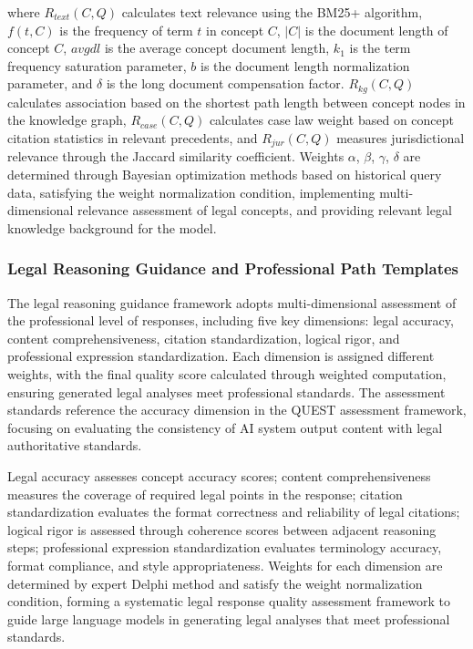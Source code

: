 \documentclass{article}
\theoremstyle{plain}
\theoremstyle{definition}
\begin{document}
where $R_{text}(C, Q)$ calculates text relevance using the BM25+ algorithm, $f(t, C)$ is the frequency of term $t$ in concept $C$, $|C|$ is the document length of concept $C$, $avgdl$ is the average concept document length, $k_1$ is the term frequency saturation parameter, $b$ is the document length normalization parameter, and $\delta$ is the long document compensation factor. $R_{kg}(C, Q)$ calculates association based on the shortest path length between concept nodes in the knowledge graph, $R_{case}(C, Q)$ calculates case law weight based on concept citation statistics in relevant precedents, and $R_{jur}(C, Q)$ measures jurisdictional relevance through the Jaccard similarity coefficient. Weights $\alpha$, $\beta$, $\gamma$, $\delta$ are determined through Bayesian optimization methods based on historical query data, satisfying the weight normalization condition, implementing multi-dimensional relevance assessment of legal concepts, and providing relevant legal knowledge background for the model.

\subsubsection{Legal Reasoning Guidance and Professional Path Templates}
\label{sec3.1.3}

The legal reasoning guidance framework adopts multi-dimensional assessment of the professional level of responses, including five key dimensions: legal accuracy, content comprehensiveness, citation standardization, logical rigor, and professional expression standardization. Each dimension is assigned different weights, with the final quality score calculated through weighted computation, ensuring generated legal analyses meet professional standards. The assessment standards reference the accuracy dimension in the QUEST assessment framework, focusing on evaluating the consistency of AI system output content with legal authoritative standards.

Legal accuracy assesses concept accuracy scores; content comprehensiveness measures the coverage of required legal points in the response; citation standardization evaluates the format correctness and reliability of legal citations; logical rigor is assessed through coherence scores between adjacent reasoning steps; professional expression standardization evaluates terminology accuracy, format compliance, and style appropriateness. Weights for each dimension are determined by expert Delphi method and satisfy the weight normalization condition, forming a systematic legal response quality assessment framework to guide large language models in generating legal analyses that meet professional standards.
\end{document}

